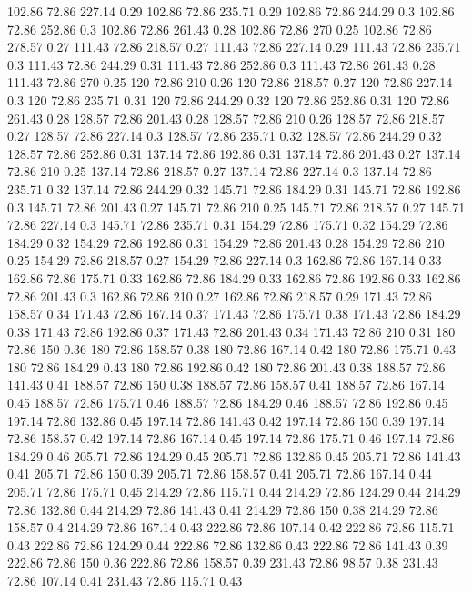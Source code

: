 102.86	72.86	227.14	0.29
102.86	72.86	235.71	0.29
102.86	72.86	244.29	0.3
102.86	72.86	252.86	0.3
102.86	72.86	261.43	0.28
102.86	72.86	270	0.25
102.86	72.86	278.57	0.27
111.43	72.86	218.57	0.27
111.43	72.86	227.14	0.29
111.43	72.86	235.71	0.3
111.43	72.86	244.29	0.31
111.43	72.86	252.86	0.3
111.43	72.86	261.43	0.28
111.43	72.86	270	0.25
120	72.86	210	0.26
120	72.86	218.57	0.27
120	72.86	227.14	0.3
120	72.86	235.71	0.31
120	72.86	244.29	0.32
120	72.86	252.86	0.31
120	72.86	261.43	0.28
128.57	72.86	201.43	0.28
128.57	72.86	210	0.26
128.57	72.86	218.57	0.27
128.57	72.86	227.14	0.3
128.57	72.86	235.71	0.32
128.57	72.86	244.29	0.32
128.57	72.86	252.86	0.31
137.14	72.86	192.86	0.31
137.14	72.86	201.43	0.27
137.14	72.86	210	0.25
137.14	72.86	218.57	0.27
137.14	72.86	227.14	0.3
137.14	72.86	235.71	0.32
137.14	72.86	244.29	0.32
145.71	72.86	184.29	0.31
145.71	72.86	192.86	0.3
145.71	72.86	201.43	0.27
145.71	72.86	210	0.25
145.71	72.86	218.57	0.27
145.71	72.86	227.14	0.3
145.71	72.86	235.71	0.31
154.29	72.86	175.71	0.32
154.29	72.86	184.29	0.32
154.29	72.86	192.86	0.31
154.29	72.86	201.43	0.28
154.29	72.86	210	0.25
154.29	72.86	218.57	0.27
154.29	72.86	227.14	0.3
162.86	72.86	167.14	0.33
162.86	72.86	175.71	0.33
162.86	72.86	184.29	0.33
162.86	72.86	192.86	0.33
162.86	72.86	201.43	0.3
162.86	72.86	210	0.27
162.86	72.86	218.57	0.29
171.43	72.86	158.57	0.34
171.43	72.86	167.14	0.37
171.43	72.86	175.71	0.38
171.43	72.86	184.29	0.38
171.43	72.86	192.86	0.37
171.43	72.86	201.43	0.34
171.43	72.86	210	0.31
180	72.86	150	0.36
180	72.86	158.57	0.38
180	72.86	167.14	0.42
180	72.86	175.71	0.43
180	72.86	184.29	0.43
180	72.86	192.86	0.42
180	72.86	201.43	0.38
188.57	72.86	141.43	0.41
188.57	72.86	150	0.38
188.57	72.86	158.57	0.41
188.57	72.86	167.14	0.45
188.57	72.86	175.71	0.46
188.57	72.86	184.29	0.46
188.57	72.86	192.86	0.45
197.14	72.86	132.86	0.45
197.14	72.86	141.43	0.42
197.14	72.86	150	0.39
197.14	72.86	158.57	0.42
197.14	72.86	167.14	0.45
197.14	72.86	175.71	0.46
197.14	72.86	184.29	0.46
205.71	72.86	124.29	0.45
205.71	72.86	132.86	0.45
205.71	72.86	141.43	0.41
205.71	72.86	150	0.39
205.71	72.86	158.57	0.41
205.71	72.86	167.14	0.44
205.71	72.86	175.71	0.45
214.29	72.86	115.71	0.44
214.29	72.86	124.29	0.44
214.29	72.86	132.86	0.44
214.29	72.86	141.43	0.41
214.29	72.86	150	0.38
214.29	72.86	158.57	0.4
214.29	72.86	167.14	0.43
222.86	72.86	107.14	0.42
222.86	72.86	115.71	0.43
222.86	72.86	124.29	0.44
222.86	72.86	132.86	0.43
222.86	72.86	141.43	0.39
222.86	72.86	150	0.36
222.86	72.86	158.57	0.39
231.43	72.86	98.57	0.38
231.43	72.86	107.14	0.41
231.43	72.86	115.71	0.43
